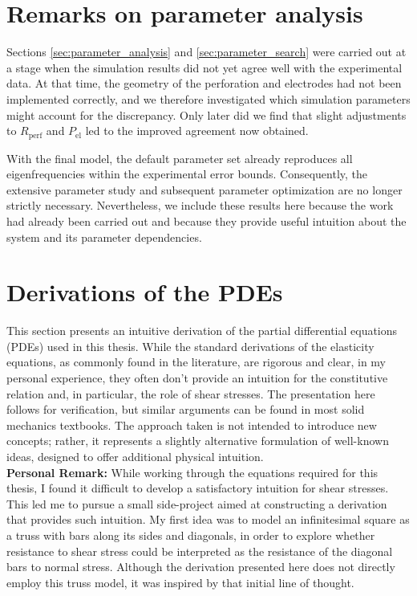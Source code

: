 \appendix

\printbibliography
{} 

\newpage


\chapter{Remarks on parameter analysis}
\label{sec:remarks_parameter_analysis}

Sections \ref{sec:parameter_analysis} and \ref{sec:parameter_search} were carried out at a stage when the simulation results did not yet agree well with the experimental data. At that time, the geometry of the perforation and electrodes had not been implemented correctly, and we therefore investigated which simulation parameters might account for the discrepancy. Only later did we find that slight adjustments to $R_\mathrm{perf}$ and $P_\mathrm{el}$ led to the improved agreement now obtained.

With the final model, the default parameter set already reproduces all eigenfrequencies within the experimental error bounds. Consequently, the extensive parameter study and subsequent parameter optimization are no longer strictly necessary. Nevertheless, we include these results here because the work had already been carried out and because they provide useful intuition about the system and its parameter dependencies.


\chapter{Derivations of the PDEs}

This section presents an intuitive derivation of the partial differential equations (PDEs) used in this thesis. While the standard derivations of the elasticity equations, as commonly found in the literature, are rigorous and clear, in my personal experience, they often don't provide an intuition for the constitutive relation and, in particular, the role of shear stresses. The presentation here follows \cite{fung2001classical} for verification, but similar arguments can be found in most solid mechanics textbooks. The approach taken is not intended to introduce new concepts; rather, it represents a slightly alternative formulation of well-known ideas, designed to offer additional physical intuition.\\
\textbf{Personal Remark:} While working through the equations required for this thesis, I found it difficult to develop a satisfactory intuition for shear stresses. This led me to pursue a small side-project aimed at constructing a derivation that provides such intuition. My first idea was to model an infinitesimal square as a truss with bars along its sides and diagonals, in order to explore whether resistance to shear stress could be interpreted as the resistance of the diagonal bars to normal stress. Although the derivation presented here does not directly employ this truss model, it was inspired by that initial line of thought.


